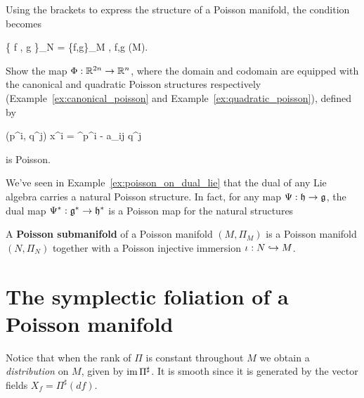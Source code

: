 \documentclass[main.tex]{subfiles}
\begin{document}
Using the brackets to express the structure of a Poisson manifold, the condition becomes
\begin{eqalign}
	\{ f \circ \phi, g \circ \phi \}_N = \{f,g\}_M \circ \phi, \quad \forall f,g \in \Cinfty(M).
\end{eqalign}

\begin{exercise}
	Show the map $\Phi : \mathbb{R}^{2n} \to \mathbb{R}^n$, where the domain and codomain are equipped with the canonical and quadratic Poisson structures respectively (Example~\ref{ex:canonical_poisson} and Example~\ref{ex:quadratic_poisson}), defined by
	\begin{eqalign}
		(p^i, q^j) \mapsto x^i = \e^{p^i -  a_{ij} q^j}
	\end{eqalign}
	is Poisson.
\end{exercise}
\begin{example}
	We've seen in Example~\ref{ex:poisson_on_dual_lie} that the dual of any Lie algebra carries a natural Poisson structure. In fact, for any map $\Psi : \mathfrak h \to \mathfrak g$, the dual map $\Psi^* : \mathfrak g^* \to \mathfrak h^*$ is a Poisson map for the natural structures
\end{example}

\begin{definition}
	A \textbf{Poisson submanifold} of a Poisson manifold $(M, \Pi_M)$ is a Poisson manifold $(N, \Pi_N)$ together with a Poisson injective immersion $\iota: N \hookrightarrow M$.
\end{definition}

\section{The symplectic foliation of a Poisson manifold}
Notice that when the rank of $\Pi$ is constant throughout $M$ we obtain a \emph{distribution} on $M$, given by $\operatorname{im} \Pi^\sharp$. It is smooth since it is generated by the vector fields $X_f = \Pi^\sharp (df)$.
\end{document}
